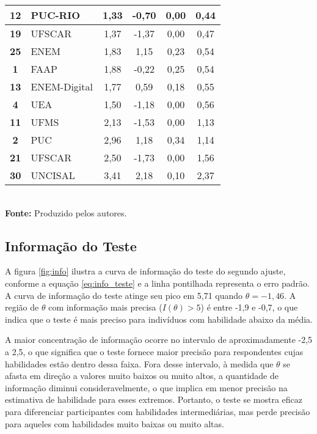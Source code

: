 \begin{table}[h]
\begin{tabular}{clcccc}
		\hline \textbf{12} & PUC-RIO & 1,33 & -0,70 & 0,00 & 0,44 \\ 
		\hline \textbf{19} & UFSCAR & 1,37 & -1,37 & 0,00 & 0,47 \\ 
		\hline \textbf{25} & ENEM & 1,83 & 1,15 & 0,23 & 0,54 \\ 
		\hline \textbf{1 }& FAAP & 1,88 & -0,22 & 0,25 & 0,54 \\ 
		\hline \textbf{13} & ENEM-Digital & 1,77 & 0,59 & 0,18 & 0,55 \\ 
		\hline \textbf{4 }& UEA & 1,50 & -1,18 & 0,00 & 0,56 \\ 
		\hline \textbf{11} & UFMS & 2,13 & -1,53 & 0,00 & 1,13 \\ 
		\hline \textbf{2 }& PUC & 2,96 & 1,18 & 0,34 & 1,14 \\ 
		\hline \textbf{21} & UFSCAR & 2,50 & -1,73 & 0,00 & 1,56 \\ 
		\hline \textbf{30} & UNCISAL & 3,41 & 2,18 & 0,10 & 2,37 \\
		\hline
		\end{tabular}\\
		\vspace*{0.5cm}
		\small{\textbf{Fonte:} Produzido pelos autores.}
\end{table}



\subsection{Informação do Teste}

A figura \ref{fig:info} ilustra a curva de informação do teste do segundo ajuste, conforme a equação \ref{eq:info_teste} e a linha pontilhada representa o erro padrão. A curva de informação do teste atinge seu pico em 5,71 quando $\theta = -1,46$. A região de $\theta$ com informação mais precisa ($I(\theta) > 5$) é entre -1,9 e -0,7, o que indica que o teste é mais preciso para indivíduos com habilidade abaixo da média. 

A maior concentração de informação ocorre no intervalo de aproximadamente -2,5 a 2,5, o que significa que o teste fornece maior precisão para respondentes cujas habilidades estão dentro dessa faixa. Fora desse intervalo, à medida que $\theta$ se afasta em direção a valores muito baixos ou muito altos, a quantidade de informação diminui consideravelmente, o que implica em menor precisão na estimativa de habilidade para esses extremos. Portanto, o teste se mostra eficaz para diferenciar participantes com habilidades intermediárias, mas perde precisão para aqueles com habilidades muito baixas ou muito altas.

